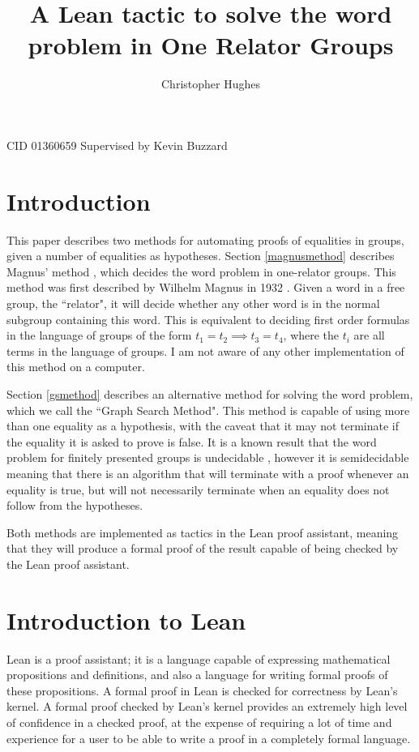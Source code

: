 \documentclass[12pt]{article} %
\title{A Lean tactic to solve the word problem in One Relator Groups}
\author{Christopher Hughes}
\theoremstyle{definition}
\theoremstyle{definition}
\theoremstyle{definition}
\theoremstyle{definition}
\begin{document}
\maketitle
CID 01360659 \newline
Supervised by Kevin Buzzard
\pagebreak
\tableofcontents
\pagebreak

\section{Introduction}

This paper describes two methods for automating proofs of equalities in groups, given
a number of equalities as hypotheses. Section \ref{magnusmethod} describes Magnus' method
\cite{mccool_schupp_1973}, which decides the word problem in one-relator groups.
This method was first described by Wilhelm Magnus in 1932 \cite{magnus1932}. Given a word in
a free group, the ``relator", it will decide whether any other word is in the
normal subgroup containing this word. This is equivalent to deciding first order
formulas in the language of groups of the form $t_1 = t_2 \implies t_3 = t_4$,
where the $t_i$ are all terms in the language of groups.
I am not aware of any other implementation of this method on a computer.

Section \ref{gsmethod} describes an alternative method for solving the word problem,
which we call the ``Graph Search Method".
This method is capable of using more than one equality as a hypothesis,
with the caveat that it may not terminate if the equality it is asked to prove is false.
It is a known result that the word problem for finitely presented groups is undecidable
\cite{collins1986}, however it is semidecidable meaning that  there is an algorithm
that will terminate with a proof whenever an equality is true, but will not necessarily
terminate when an equality does not follow from the hypotheses.

Both methods are implemented as tactics in the Lean proof assistant, meaning that
they will produce a formal proof of the result capable of being checked by the Lean
proof assistant.

\section{Introduction to Lean}

Lean \cite{MR3446905} is a proof assistant;
it is a language capable of expressing mathematical propositions
and definitions, and also a language for writing formal proofs of these propositions.
A formal proof in Lean is checked for correctness by Lean's kernel.
A formal proof checked by Lean's kernel provides
an extremely high level of confidence in a checked proof, at the expense of requiring a lot
of time and experience for a user to be able to write a proof in a completely formal language.
\end{document}
